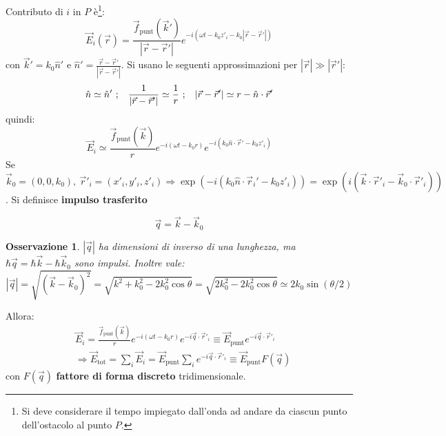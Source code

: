 \documentclass[10pt, a4paper]{scrartcl}
\numberwithin{equation}{subsection}
\theoremstyle{style1}
\newtheorem{osservazione}{Osservazione}[section]
\newenvironment{boxenv}[1][]{
    \begin{eqbox}[#1]
    }{
   \end{eqbox}
}
\begin{document}
Contributo di $i$ in $P$ \`e\footnote{Si deve considerare il tempo impiegato dall'onda ad andare da ciascun punto dell'ostacolo al punto $P$.}:
\begin{equation}
	\vec{E}_i (\vec{r}) = \frac{\vec{f}_\text{punt}(\vec{k}')}{\left\lvert \vec{r}-\vec{r}' \right\rvert } e^{-i(\omega t - k_0 z'_i - k_0 \left\lvert \vec{r}-\vec{r}' \right\rvert )} 
\end{equation}
con $\vec{k}' = k_0\hat{n}'$ e $\hat{n}' = \frac{\vec{r}-\vec{r}'}{\left\lvert \vec{r}-\vec{r}' \right\rvert }$. Si usano le seguenti approssimazioni per $\left\lvert \vec{r} \right\rvert \gg \left\lvert \vec{r}' \right\rvert $:
\[
	\hat{n} \simeq \hat{n}'\ ;\hspace{.3cm}  \frac{1}{\left\lvert \vec{r}-\vec{r}' \right\rvert }\simeq \frac{1}{r}\ ;\hspace{.3cm} \left\lvert \vec{r}-\vec{r}' \right\rvert \simeq r - \hat{n}\cdot \vec{r}'
\] 
quindi:
\begin{equation}
	\vec{E}_i \simeq \frac{\vec{f}_\text{punt}(\vec{k})}{r}e^{-i(\omega t - k_0 r)} e^{-i (k_0\hat{n}\cdot \vec{r}' - k_0 z'_i)} 
\end{equation}
Se $\vec{k}_0 = (0,0,k_0),  \ \vec{r}'_i=(x'_i, y'_i,z'_i)\Rightarrow \exp\left(-i(k_0\hat{n}\cdot \vec{r}_i' - k_0z'_i)\right)  = \exp \left(i(\vec{k}\cdot \vec{r}'_i - \vec{k}_0 \cdot \vec{r}'_i)\right) $. Si definisce \textbf{impulso trasferito} 
\begin{boxenv}[]
	\begin{equation}
		\vec{q}= \vec{k}- \vec{k}_0
	\end{equation}
\end{boxenv}
\begin{osservazione}
	$|\vec{q}|$ ha dimensioni di inverso di una lunghezza, ma $\hbar \vec{q}= \hbar \vec{k} - \hbar \vec{k}_0$ sono impulsi. Inoltre vale:
	\begin{equation}
		|\vec{q}| = \sqrt{(\vec{k}-\vec{k}_0)^2} = \sqrt{k^2 + k_0^2 - 2k_0^2 \cos \theta } = \sqrt{2k_0^2 - 2 k_0^2 \cos \theta } \simeq 2k_0 \sin(\theta / 2)
	\end{equation}
\end{osservazione}
\noindent Allora:
\begin{equation}\label{2.2.11}
	\begin{split}
		&\vec{E}_i = \frac{\vec{f}_\text{punt}(\vec{k})}{r} e^{-i(\omega t - k_0r )} e ^{-i \vec{q}\cdot \vec{r}' _i} \equiv \vec{E}_\text{punt}e^{-i\vec{q}\cdot \vec{r}'_i} \\
		&\Rightarrow  \vec{E}_\text{tot}=\sum_{i}^{} \vec{E}_i = \vec{E}_\text{punt}\sum_{i}^{} e^{-i \vec{q}\cdot \vec{r}'_i} \equiv \vec{E}_\text{punt} F(\vec{q})
	\end{split}
\end{equation}
con $F(\vec{q})$ \textbf{fattore di forma discreto} tridimensionale. 
\end{document}
